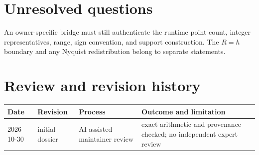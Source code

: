 \documentclass[11pt]{article}
\begin{document}
\section{Unresolved questions}
An owner-specific bridge must still authenticate the runtime point count, integer representatives,
range, sign convention, and support construction.  The $R=h$ boundary and any Nyquist
redistribution belong to separate statements.

\section{Review and revision history}
\begin{tabularx}{\textwidth}{@{}lllX@{}}
\toprule
Date & Revision & Process & Outcome and limitation \\
\midrule
2026-10-30 & initial dossier & AI-assisted maintainer review & exact arithmetic and provenance checked; no independent expert review \\
\bottomrule
\end{tabularx}
\end{document}
